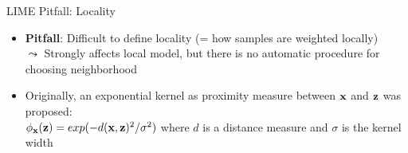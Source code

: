 \documentclass[11pt,compress,t,notes=noshow, aspectratio=169, xcolor=table]{beamer}
\begin{document}
\begin{frame}[c]{LIME Pitfall: Locality}

	\begin{itemize} 
     \item \textbf{Pitfall}: Difficult to define locality (= how samples are weighted locally) \\
     $\leadsto$ Strongly affects local model, but there is no automatic procedure for choosing neighborhood
     \item Originally, an exponential kernel as proximity measure between $\xv$ and $\zv$ was proposed:\\
     	$\neigh(\zv) = exp(-d(\xv, \zv)^2/\sigma^2)$ where $d$ is a distance measure and $\sigma$ is the kernel width 
     		
     		

\end{itemize}
\end{frame}
\end{document}
